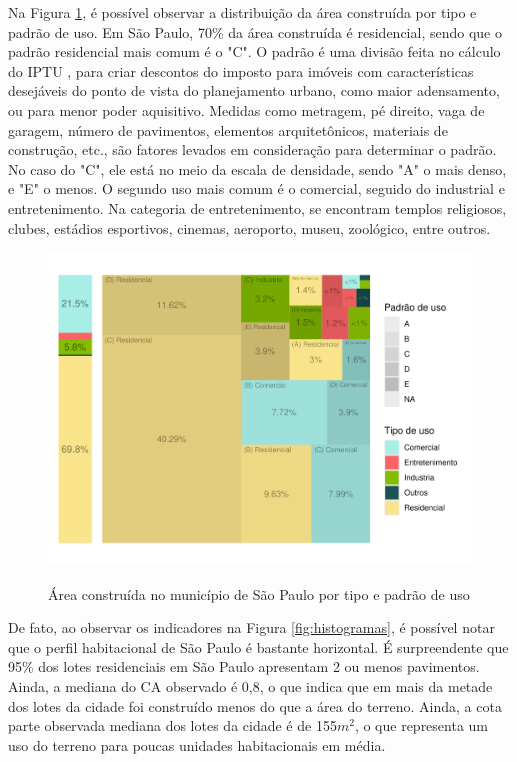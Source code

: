 Na Figura \ref{fig:area_construida}, é possível observar a distribuição da área construída por tipo e padrão de uso. Em São Paulo, 70\% da área construída é residencial, sendo que o padrão residencial mais comum é o "C". O padrão é uma divisão feita no cálculo do IPTU \cite{lei10235_1986}, para criar descontos do imposto para imóveis com características desejáveis do ponto de vista do planejamento urbano, como maior adensamento, ou para menor poder aquisitivo. Medidas como metragem, pé direito, vaga de garagem, número de pavimentos, elementos arquitetônicos, materiais de construção, etc., são fatores levados em consideração para determinar o padrão. No caso do "C", ele está no meio da escala de densidade, sendo "A" o mais denso, e "E" o menos. O segundo uso mais comum é o comercial, seguido do industrial e entretenimento. Na categoria de entretenimento, se encontram templos religiosos, clubes, estádios esportivos, cinemas, aeroporto, museu, zoológico, entre outros.

\begin{figure}[h]
    \centering
    \caption{Área construída no município de São Paulo por tipo e padrão de uso}
    \includegraphics[width = .8\linewidth]{imagens/tree_area_construida.pdf}
    \label{fig:area_construida}
\end{figure}

De fato, ao observar os indicadores na Figura \ref{fig:histogramas}, é possível notar que o perfil habitacional de São Paulo é bastante horizontal. É surpreendente que 95\% dos lotes residenciais em São Paulo apresentam 2 ou menos pavimentos. Ainda, a mediana do CA observado é 0,8, o que indica que em mais da metade dos lotes da cidade foi construído menos do que a área do terreno. Ainda, a cota parte observada mediana dos lotes da cidade é de 155$m^2$, o que representa um uso do terreno para poucas unidades habitacionais em média. 

